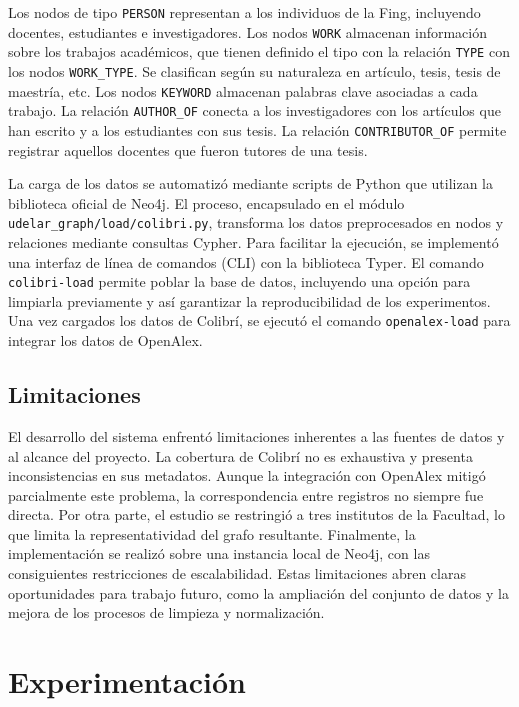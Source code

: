 \documentclass[journal]{IEEEtran}
\begin{document}
Los nodos de tipo \texttt{PERSON} representan a los individuos de la Fing, incluyendo docentes, estudiantes e investigadores. Los nodos \texttt{WORK} almacenan información sobre los trabajos académicos, que tienen definido el tipo con la relación \texttt{TYPE} con los nodos \texttt{WORK\_TYPE}. Se clasifican según su naturaleza en artículo, tesis, tesis de maestría, etc. Los nodos \texttt{KEYWORD} almacenan palabras clave asociadas a cada trabajo.
La relación \texttt{AUTHOR\_OF} conecta a los investigadores con los artículos que han escrito y a los estudiantes con sus tesis. La relación \texttt{CONTRIBUTOR\_OF} permite registrar aquellos docentes que fueron tutores de una tesis.

La carga de los datos se automatizó mediante scripts de Python que utilizan la biblioteca oficial de Neo4j. El proceso, encapsulado en el módulo \texttt{udelar\_graph/load/colibri.py}, transforma los datos preprocesados en nodos y relaciones mediante consultas Cypher. Para facilitar la ejecución, se implementó una interfaz de línea de comandos (CLI) con la biblioteca Typer. El comando \texttt{colibri-load} permite poblar la base de datos, incluyendo una opción para limpiarla previamente y así garantizar la reproducibilidad de los experimentos. Una vez cargados los datos de Colibrí, se ejecutó el comando \texttt{openalex-load} para integrar los datos de OpenAlex.

\subsection{Limitaciones}
El desarrollo del sistema enfrentó limitaciones inherentes a las fuentes de datos y al alcance del proyecto. La cobertura de Colibrí no es exhaustiva y presenta inconsistencias en sus metadatos. Aunque la integración con OpenAlex mitigó parcialmente este problema, la correspondencia entre registros no siempre fue directa. Por otra parte, el estudio se restringió a tres institutos de la Facultad, lo que limita la representatividad del grafo resultante. Finalmente, la implementación se realizó sobre una instancia local de Neo4j, con las consiguientes restricciones de escalabilidad. Estas limitaciones abren claras oportunidades para trabajo futuro, como la ampliación del conjunto de datos y la mejora de los procesos de limpieza y normalización.

\section{Experimentación}
\label{expe}
\end{document}
